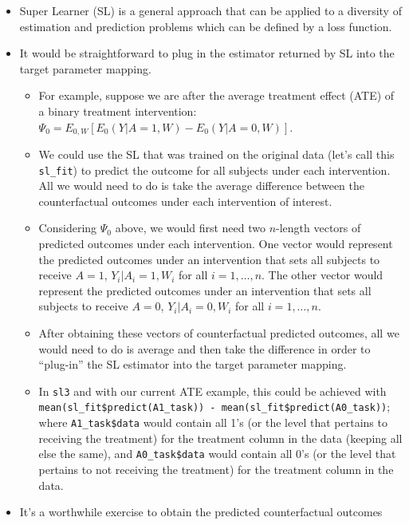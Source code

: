 \documentclass[12pt, krantz2,]{book}
\providecommand{\tightlist}{%
  \setlength{\itemsep}{0pt}\setlength{\parskip}{0pt}}
\theoremstyle{definition}
\theoremstyle{definition}
\theoremstyle{definition}
\newcommand{\1}{\mathbbm{1}}
\begin{document}
\begin{itemize}
\item
  Super Learner (SL) is a general approach that can be applied to a diversity of
  estimation and prediction problems which can be defined by a loss function.
\item
  It would be straightforward to plug in the estimator returned by SL into the
  target parameter mapping.

  \begin{itemize}
  \tightlist
  \item
    For example, suppose we are after the average treatment effect (ATE) of a
    binary treatment intervention:
    \(\Psi_0 = E_{0,W}[E_0(Y|A=1,W) - E_0(Y|A=0,W)]\).
  \item
    We could use the SL that was trained on the original data (let's call
    this \texttt{sl\_fit}) to predict the outcome for all subjects under each
    intervention. All we would need to do is take the average difference
    between the counterfactual outcomes under each intervention of interest.
  \item
    Considering \(\Psi_0\) above, we would first need two \(n\)-length vectors of
    predicted outcomes under each intervention. One vector would represent
    the predicted outcomes under an intervention that sets all subjects to
    receive \(A=1\), \(Y_i|A_i=1,W_i\) for all \(i=1,\ldots,n\). The other vector
    would represent the predicted outcomes under an intervention that sets
    all subjects to receive \(A=0\), \(Y_i|A_i=0,W_i\) for all \(i=1,\ldots,n\).
  \item
    After obtaining these vectors of counterfactual predicted outcomes, all
    we would need to do is average and then take the difference in order to
    ``plug-in'' the SL estimator into the target parameter mapping.
  \item
    In \texttt{sl3} and with our current ATE example, this could be achieved with
    \texttt{mean(sl\_fit\$predict(A1\_task))\ -\ mean(sl\_fit\$predict(A0\_task))};
    where \texttt{A1\_task\$data} would contain all 1's (or the level that pertains to
    receiving the treatment) for the treatment column in the data (keeping
    all else the same), and \texttt{A0\_task\$data} would contain all 0's (or the
    level that pertains to not receiving the treatment) for the treatment
    column in the data.
  \end{itemize}
\item
  It's a worthwhile exercise to obtain the predicted counterfactual outcomes

\end{itemize}
\end{document}
